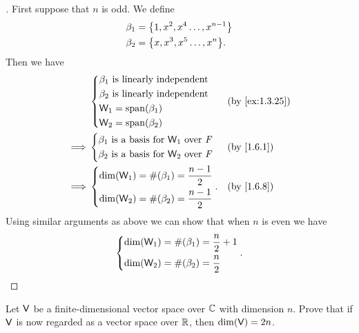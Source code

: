 \begin{proof}[]
	First suppose that \(n\) is odd.
	We define
	\begin{align*}
		\beta_1 & = \set{1, x^2, x^4 \dots, x^{n - 1}} \\
		\beta_2 & = \set{x, x^3, x^5 \dots, x^n}.
	\end{align*}
	Then we have
	\begin{align*}
		         & \begin{dcases}
			           \beta_1 \text{ is linearly independent} \\
			           \beta_2 \text{ is linearly independent} \\
			           \W_1 = \spn{\beta_1}                    \\
			           \W_2 = \spn{\beta_2}
		           \end{dcases}               &  & \by{ex:1.3.25}        \\
		\implies & \begin{dcases}
			           \beta_1 \text{ is a basis for } \W_1 \text{ over } \F \\
			           \beta_2 \text{ is a basis for } \W_2 \text{ over } \F
		           \end{dcases} &  & \by{1.6.1} \\
		\implies & \begin{dcases}
			           \dim(\W_1) = \#(\beta_1) = \frac{n - 1}{2} \\
			           \dim(\W_2) = \#(\beta_2) = \frac{n - 1}{2}
		           \end{dcases}.            &  & \by{1.6.8}
	\end{align*}
	Using similar arguments as above we can show that when \(n\) is even we have
	\[
		\begin{dcases}
			\dim(\mathsf{W}_1) = \#(\beta_1) = \frac{n}{2} + 1 \\
			\dim(\mathsf{W}_2) = \#(\beta_2) = \frac{n}{2}
		\end{dcases}.
	\]
\end{proof}

\begin{ex}\label{ex:1.6.28}
	Let \(\mathsf{V}\) be a finite-dimensional vector space over \(\mathbb{C}\) with dimension \(n\).
	Prove that if \(\mathsf{V}\) is now regarded as a vector space over \(\mathbb{R}\), then \(\dim(\mathsf{V}) = 2n\).
\end{ex}

